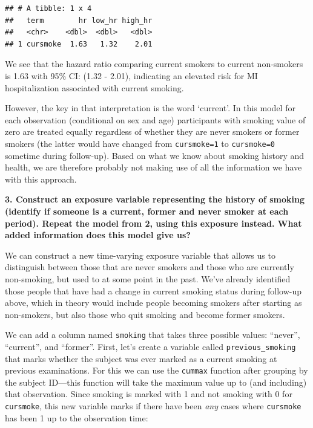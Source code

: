 \documentclass[
]{book}
\begin{document}
\begin{verbatim}
## # A tibble: 1 x 4
##   term        hr low_hr high_hr
##   <chr>    <dbl>  <dbl>   <dbl>
## 1 cursmoke  1.63   1.32    2.01
\end{verbatim}

We see that the hazard ratio comparing current smokers to current non-smokers is 1.63 with 95\% CI: (1.32 - 2.01), indicating an elevated risk for MI hospitalization associated with current smoking.

However, the key in that interpretation is the word `current'. In this model for each observation (conditional on sex and age) participants with smoking value of zero are treated equally regardless of whether they are never smokers or former smokers (the latter would have changed from \texttt{cursmoke=1} to \texttt{cursmoke=0} sometime during follow-up). Based on what we know about smoking history and health, we are therefore probably not making use of all the information we have with this approach.

\textbf{3. Construct an exposure variable representing the history of smoking (identify if someone is a current, former and never smoker at each period). Repeat the model from 2, using this exposure instead. What added information does this model give us?}

We can construct a new time-varying exposure variable that allows us to distinguish between those that are never smokers and those who are currently non-smoking, but used to at some point in the past. We've already identified those people that have had a change in current smoking status during follow-up above, which in theory would include people becoming smokers after starting as non-smokers, but also those who quit smoking and become former smokers.

We can add a column named \texttt{smoking} that takes three possible values: ``never'', ``current'', and ``former''. First, let's create a variable called \texttt{previous\_smoking} that marks whether the subject was ever marked as a current smoking at previous examinations. For this we can use the \texttt{cummax} function after grouping by the subject ID---this function will take the maximum value up to (and including) that observation. Since smoking is marked with 1 and not smoking with 0 for \texttt{cursmoke}, this new variable marks if there have been \emph{any} cases where \texttt{cursmoke} has been 1 up to the observation time:
\end{document}
